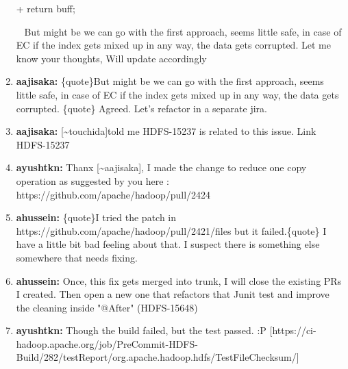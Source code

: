 \documentclass{report}%
\begin{document}
\begin{enumerate}
\begin{spverbatim}
+  return buff;\end{spverbatim}\ \newline%
\newline%
But might be we can go with the first approach, seems little safe, in case of EC if the index gets mixed up in any way, the data gets corrupted. Let me know your thoughts, Will update accordingly%
\item%
\textbf{aajisaka: }\{quote\}But might be we can go with the first approach, seems little safe, in case of EC if the index gets mixed up in any way, the data gets corrupted.\newline%
\newline%
\{quote\}\newline%
\newline%
Agreed. Let's refactor in a separate jira.%
\item%
\textbf{aajisaka: }{[}\textasciitilde{}touchida{]}told me HDFS{-}15237 is related to this issue. Link HDFS{-}15237%
\item%
\textbf{ayushtkn: }Thanx {[}\textasciitilde{}aajisaka{]}, I made the change to reduce one copy operation as suggested by you here :\newline%
\newline%
\newline%
\newline%
https://github.com/apache/hadoop/pull/2424%
\item%
\textbf{ahussein: }\{quote\}I tried the patch in https://github.com/apache/hadoop/pull/2421/files but it failed.\{quote\}\newline%
\newline%
\newline%
\newline%
I have a little bit bad feeling about that. I suspect there is something else somewhere that needs fixing.%
\item%
\textbf{ahussein: }Once, this fix gets merged into trunk, I will close the existing PRs I created. Then open a new one that refactors that Junit test\newline%
\newline%
and improve the cleaning inside "@After" (HDFS{-}15648)%
\item%
\textbf{ayushtkn: }Though the build failed, but the test passed. :P\newline%
\newline%
\newline%
\newline%
{[}https://ci{-}hadoop.apache.org/job/PreCommit{-}HDFS{-}Build/282/testReport/org.apache.hadoop.hdfs/TestFileChecksum/{]}\newline%

\end{enumerate}
\end{document}
